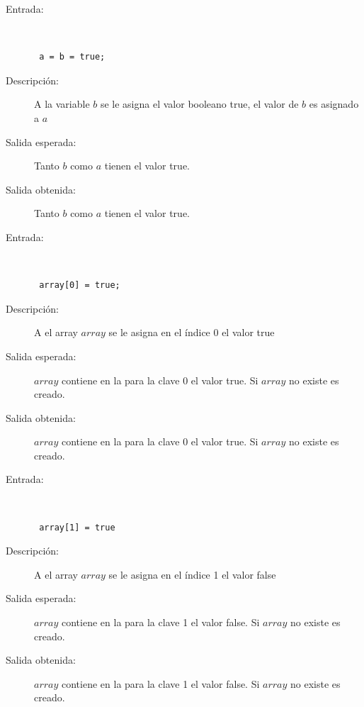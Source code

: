 \begin{framed}
	\begin{description}
		\item [Entrada:] \hfill \\
\begin{lstlisting}
 a = b = true;
\end{lstlisting}
		\item [Descripción:] A la variable $b$ se le asigna el valor booleano true, el valor de $b$ es asignado a $a$
		\item [Salida esperada:] Tanto $b$ como $a$ tienen el valor true.
		\item [Salida obtenida:] Tanto $b$ como $a$ tienen el valor true.
	\end{description}
\end{framed}
\begin{framed}
	\begin{description}
		\item [Entrada:] \hfill \\
\begin{lstlisting}
 array[0] = true;
\end{lstlisting}
		\item [Descripción:] A el array $array$ se le asigna en el índice 0 el valor true
		\item [Salida esperada:] $array$ contiene en la para la clave 0 el valor true. Si $array$ no existe es creado.
		\item [Salida obtenida:] $array$ contiene en la para la clave 0 el valor true. Si $array$ no existe es creado.
	\end{description}
\end{framed}

\begin{framed}
	\begin{description}
		\item [Entrada:] \hfill \\
\begin{lstlisting}
 array[1] = true
\end{lstlisting}
		\item [Descripción:] A el array $array$ se le asigna en el índice 1 el valor false
		\item [Salida esperada:] $array$ contiene en la para la clave 1 el valor false. Si $array$ no existe es creado.
		\item [Salida obtenida:] $array$ contiene en la para la clave 1 el valor false. Si $array$ no existe es creado.
	\end{description}
\end{framed}

